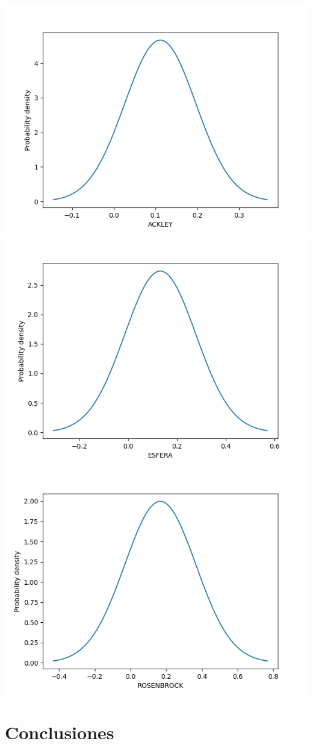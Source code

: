 \documentclass{article}
\begin{document}
\includegraphics[scale=0.5]{ES/ackley.png}
\includegraphics[scale=0.5]{ES/esfera.png}
\includegraphics[scale=0.5]{ES/rosenbrock.png}



\section{Conclusiones}
\end{document}
